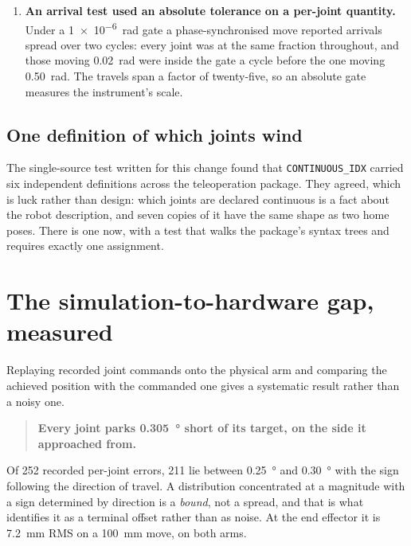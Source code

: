 \begin{enumerate}
    measured \SI{0.0509}{\milli\metre} off it. The instrument's resolution was
    being reported as the robot's behaviour. Refined by bisection on the real
    forward kinematics, the same path reads \SI{9.4e-9}{\milli\metre}.
  \item \textbf{An arrival test used an absolute tolerance on a per-joint
    quantity.} Under a \SI{1e-6}{\radian} gate a phase-synchronised move
    reported arrivals spread over two cycles: every joint was at the same
    fraction throughout, and those moving \SI{0.02}{\radian} were inside the
    gate a cycle before the one moving \SI{0.50}{\radian}. The travels span a
    factor of twenty-five, so an absolute gate measures the instrument's
    scale.
\end{enumerate}

\subsection{One definition of which joints wind}

The single-source test written for this change found that
\texttt{CONTINUOUS\_IDX} carried six independent definitions across the
teleoperation package. They agreed, which is luck rather than design: which
joints are declared continuous is a fact about the robot description, and
seven copies of it have the same shape as two home poses. There is one now,
with a test that walks the package's syntax trees and requires exactly one
assignment.

\section{The simulation-to-hardware gap, measured}
\label{sec:sim-to-real}

Replaying recorded joint commands onto the physical arm and comparing the
achieved position with the commanded one gives a systematic result rather than
a noisy one.

\begin{quote}
\textbf{Every joint parks \SI{0.305}{\degree} short of its target, on the side
it approached from.}
\end{quote}

Of \num{252} recorded per-joint errors, \num{211} lie between
\SI{0.25}{\degree} and \SI{0.30}{\degree} with the sign following the
direction of travel. A distribution concentrated at a magnitude with a sign
determined by direction is a \emph{bound}, not a spread, and that is what
identifies it as a terminal offset rather than as noise. At the end effector
it is \SI{7.2}{\milli\metre} RMS on a \SI{100}{\milli\metre} move, on both
arms.

